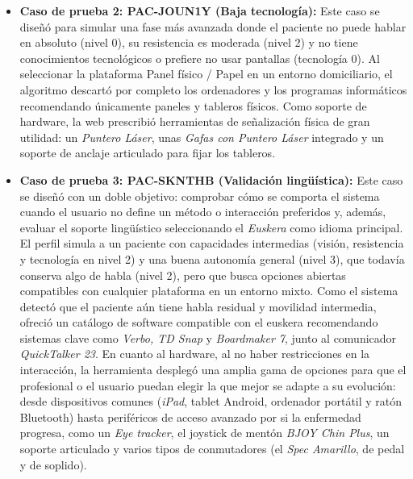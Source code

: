 \begin{itemize}
	 \item \textbf{Caso de prueba 2: PAC-JOUN1Y (Baja tecnología):}  Este caso se diseñó para simular una fase más avanzada donde el paciente no puede hablar en absoluto (nivel 0), su resistencia es moderada (nivel 2) y no tiene conocimientos tecnológicos o prefiere no usar 				pantallas (tecnología 0). Al seleccionar la plataforma Panel físico / Papel en un entorno domiciliario, el algoritmo descartó por completo los ordenadores y los programas informáticos recomendando únicamente paneles y tableros físicos.
    	Como soporte de hardware, la web prescribió herramientas de señalización física de gran utilidad: un \textit{Puntero Láser}, unas \textit{Gafas con Puntero Láser} integrado y un soporte de anclaje articulado para fijar los tableros.
	\item \textbf{Caso de prueba 3: PAC-SKNTHB (Validación lingüística):}  Este caso se diseñó con un doble objetivo: comprobar cómo se comporta el sistema cuando el usuario no define un método o interacción preferidos y, además, evaluar el soporte lingüístico seleccionando el 			\textit{Euskera} como idioma principal. El perfil simula a un paciente con capacidades intermedias (visión, resistencia y tecnología en nivel 2) y una buena autonomía general (nivel 3), que todavía conserva algo de habla (nivel 2), pero que busca opciones abiertas compatibles con 			cualquier plataforma en un entorno mixto.
	Como el sistema detectó que el paciente aún tiene habla residual y movilidad intermedia, ofreció un catálogo de software compatible con el euskera recomendando sistemas clave como \textit{Verbo, TD Snap} y \textit{Boardmaker 7}, junto al comunicador						\textit{QuickTalker 23}.
    	En cuanto al hardware, al no haber restricciones en la interacción, la herramienta desplegó una amplia gama de opciones para que el profesional o el usuario puedan elegir la que mejor se adapte a su evolución: desde dispositivos comunes (\textit{iPad}, tablet Android, ordenador 		portátil y ratón Bluetooth) hasta periféricos de acceso avanzado por si la enfermedad progresa, como un \textit{Eye tracker}, el joystick de mentón \textit{BJOY Chin Plus}, un soporte articulado y varios tipos de conmutadores (el \textit{Spec Amarillo}, de pedal y de soplido).


\end{itemize}
